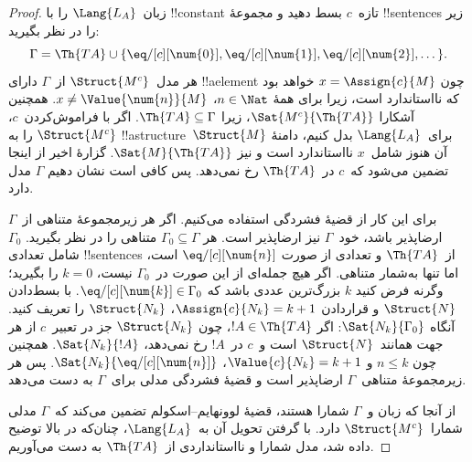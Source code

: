 \documentclass[../../../include/open-logic-section]{subfiles}
\begin{document}
\begin{proof}
زبان~$\Lang{L_A}$ را با !!{constant} تازه~$c$ بسط دهید و مجموعهٔ
!!{sentence}s زیر را در نظر بگیرید:
\[
\Gamma = \Th{TA} \cup \{\eq/[c][\num{0}], \eq/[c][\num{1}],
\eq/[c][\num{2}], \dots\}.
\]
هر مدل~$\Struct{M^c}$ از~$\Gamma$ دارای !!a{element} چون
$x = \Assign{c}{M}$ خواهد بود که نااستاندارد است، زیرا برای همهٔ
$n \in \Nat$، $x \neq \Value{\num{n}}{M}$. همچنین آشکارا
$\Sat{M^c}{\Th{TA}}$، زیرا $\Th{TA} \subseteq \Gamma$. اگر با
فراموش‌کردن~$c$، $\Struct{M^c}$ را به !!a{structure}~$\Struct{M}$
برای~$\Lang{L_A}$ بدل کنیم، دامنهٔ آن هنوز شامل~$x$ نااستاندارد است
و نیز $\Sat{M}{\Th{TA}}$. گزارهٔ اخیر از اینجا تضمین می‌شود که~$c$
در~$\Th{TA}$ رخ نمی‌دهد. پس کافی است نشان دهیم $\Gamma$ مدل دارد.

برای این کار از قضیهٔ فشردگی استفاده می‌کنیم. اگر هر زیرمجموعهٔ متناهی
از~$\Gamma$ ارضاپذیر باشد، خود~$\Gamma$ نیز ارضاپذیر است. هر
$\Gamma_0 \subseteq \Gamma$ متناهی را در نظر بگیرید.
$\Gamma_0$ شامل تعدادی !!{sentence}s از~$\Th{TA}$ و تعدادی از صورت
$\eq/[c][\num{n}]$ است، اما تنها به‌شمار متناهی. اگر هیچ جمله‌ای از
این صورت در~$\Gamma_0$ نیست، $k=0$ را بگیرید؛ وگرنه فرض کنید $k$
بزرگ‌ترین عددی باشد که $\eq/[c][\num{k}] \in \Gamma_0$. با بسط‌دادن
$\Struct{N}$ و قراردادن $\Assign{c}{N_k} = k+1$،
$\Struct{N_k}$ را تعریف کنید. آنگاه $\Sat{N_k}{\Gamma_0}$: اگر
$!A \in \Th{TA}$، چون $\Struct{N_k}$ جز در تعبیر~$c$ از هر جهت
همانند~$\Struct{N}$ است و~$c$ در~$!A$ رخ نمی‌دهد،
$\Sat{N_k}{!A}$. همچنین چون $n \le k$ و
$\Value{c}{N_k} = k+1$،
$\Sat{N_k}{\eq/[c][\num{n}]}$. پس هر زیرمجموعهٔ متناهی~$\Gamma$
ارضاپذیر است و قضیهٔ فشردگی مدلی برای~$\Gamma$ به دست می‌دهد.

از آنجا که زبان و~$\Gamma$ شمارا هستند، قضیهٔ لوونهایم--اسکولم تضمین
می‌کند که~$\Gamma$ مدلی شمارا~$\Struct{M^c}$ دارد. با گرفتن تحویل آن
به~$\Lang{L_A}$، چنان‌که در بالا توضیح داده شد، مدل شمارا و
نااستانداردی از~$\Th{TA}$ به دست می‌آوریم.
\end{proof}
\end{document}
